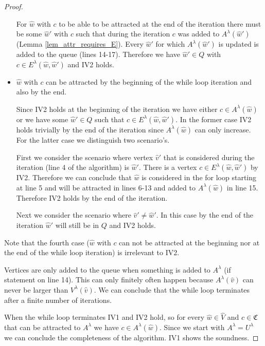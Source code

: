 \begin{theorem}
\begin{proof}
\begin{itemize}
			For $\hat{w}$ with $c$ to be able to be attracted at the end of the iteration there must be some $\hat{w}'$ with $c$ such that during the iteration $c$ was added to $A^\lambda(\hat{w}')$ (Lemma \ref{lem_attr_requires_E}). Every $\hat{w}'$ for which $A^\lambda(\hat{w}')$ is updated is added to the queue (lines 14-17). Therefore we have $\hat{w}' \in Q$ with $c \in E^\lambda(\hat{w},\hat{w}')$ and IV2 holds.
			\item $\hat{w}$ with $c$ can be attracted by the beginning of the while loop iteration and also by the end.
			
			Since IV2 holds at the beginning of the iteration we have either $c \in A^\lambda(\hat{w})$ or we have some $\hat{w}' \in Q$ such that $c \in E^\lambda(\hat{w},\hat{w}')$. In the former case IV2 holds trivially by the end of the iteration since $A^\lambda(\hat{w})$ can only increase. For the latter case we distinguish two scenario's. 
			
			First we consider the scenario where vertex $\hat{v}'$ that is considered during the iteration (line 4 of the algorithm) is $\hat{w}'$. There is a vertex $c \in E^\lambda(\hat{w},\hat{w}')$ by IV2. Therefore we can conclude that $\hat{w}$ is considered in the for loop starting at line 5 and will be attracted in lines 6-13 and added to $A^\lambda(\hat{w})$ in line 15. Therefore IV2 holds by the end of the iteration.
			
			Next we consider the scenario where $\hat{v}' \neq \hat{w}'$. In this case by the end of the iteration $\hat{w}'$ will still be in $Q$ and IV2 holds.
		\end{itemize}
		Note that the fourth case ($\hat{w}$ with $c$ can not be attracted at the beginning nor at the end of the while loop iteration) is irrelevant to IV2.
	
		Vertices are only added to the queue when something is added to $A^\lambda$ (if statement on line 14). This can only finitely often happen because $A^\lambda(\hat{v})$ can never be larger than $V^\lambda(\hat{v})$. We can conclude that the while loop terminates after a finite number of iterations.
	
		When the while loop terminates IV1 and IV2 hold, so for every $\hat{w} \in \hat{V}$ and $c \in \mathfrak{C}$ that can be attracted to $A^\lambda$ we have $c \in A^\lambda(\hat{w})$. Since we start with $A^\lambda = U^\lambda$ we can conclude the completeness of the algorithm. IV1 shows the soundness.
	\end{proof}
\end{theorem}


